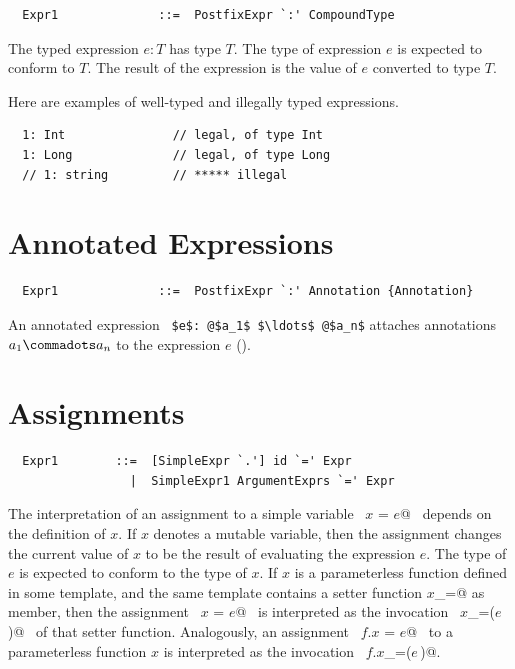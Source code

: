 \syntax\begin{lstlisting}
  Expr1              ::=  PostfixExpr `:' CompoundType
\end{lstlisting}

The typed expression $e: T$ has type $T$. The type of
expression $e$ is expected to conform to $T$. The result of
the expression is the value of $e$ converted to type $T$.

\example Here are examples of well-typed and illegally typed expressions.

\begin{lstlisting}
  1: Int               // legal, of type Int
  1: Long              // legal, of type Long
  // 1: string         // ***** illegal
\end{lstlisting}



\section{Annotated Expressions}

\syntax\begin{lstlisting}
  Expr1              ::=  PostfixExpr `:' Annotation {Annotation} 
\end{lstlisting}

An annotated expression ~\lstinline^$e$: @$a_1$ $\ldots$ @$a_n$^
attaches annotations $a_1 \commadots a_n$ to the expression $e$
().

\section{Assignments}\label{sec:assigments}

\syntax\begin{lstlisting}
  Expr1        ::=  [SimpleExpr `.'] id `=' Expr
                 |  SimpleExpr1 ArgumentExprs `=' Expr
\end{lstlisting}

The interpretation of an assignment to a simple variable ~\lstinline@$x$ = $e$@~
depends on the definition of $x$. If $x$ denotes a mutable
variable, then the assignment changes the current value of $x$ to be
the result of evaluating the expression $e$. The type of $e$ is
expected to conform to the type of $x$. If $x$ is a parameterless
function defined in some template, and the same template contains a
setter function \lstinline@$x$_=@ as member, then the assignment
~\lstinline@$x$ = $e$@~ is interpreted as the invocation
~\lstinline@$x$_=($e\,$)@~ of that setter function.  Analogously, an
assignment ~\lstinline@$f.x$ = $e$@~ to a parameterless function $x$
is interpreted as the invocation ~\lstinline@$f.x$_=($e\,$)@.

